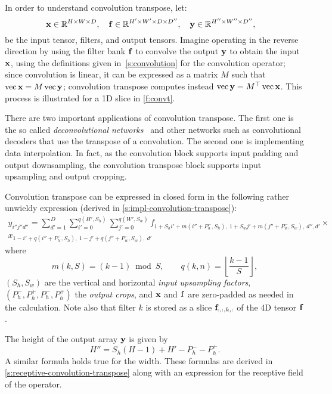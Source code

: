 In order to understand convolution transpose, let:
\[
 \mathbf{x}\in\mathbb{R}^{H \times W \times D}, \quad
 \mathbf{f}\in\mathbb{R}^{H' \times W' \times D \times D''}, \quad
 \mathbf{y}\in\mathbb{R}^{H'' \times W'' \times D''}, \quad
\]
be the input tensor, filters, and output tensors. Imagine operating in the reverse direction by using the filter bank $\mathbf{f}$ to convolve the output $\mathbf{y}$ to obtain the input $\mathbf{x}$, using the definitions given in~\cref{s:convolution} for the convolution operator; since convolution is linear, it can be expressed as a matrix $M$ such that  $\operatorname{vec} \mathbf{x} = M \operatorname{vec}\mathbf{y}$; convolution transpose computes instead $\operatorname{vec} \mathbf{y} = M^\top \operatorname{vec} \mathbf{x}$. This process is illustrated for a 1D slice in \cref{f:convt}.

There are two important applications of convolution transpose. The first one is the so called \emph{deconvolutional networks}~\cite{zeiler14visualizing} and other networks such as convolutional decoders that use the transpose of a convolution. The second one is implementing data interpolation. In fact, as the convolution block supports input padding and output downsampling, the convolution transpose block supports input upsampling and output cropping.

Convolution transpose can be expressed in closed form in the following rather unwieldy expression (derived in \cref{s:impl-convolution-transpose}):
\begin{multline}\label{e:convt}
y_{i''j''d''} =
 \sum_{d'=1}^{D}
 \sum_{i'=0}^{q(H',S_h)}
 \sum_{j'=0}^{q(W',S_w)}
f_{
1+ S_hi' + m(i''+ P_h^-, S_h),\ %
1+ S_wj' + m(j''+ P_w^-, S_w),\ %
d'',
d'
}
\times \\
x_{
1 - i' + q(i''+P_h^-,S_h),\ %
1 - j' + q(j''+P_w^-,S_w),\ %
d'
}
\end{multline}
where
\[
m(k,S) = (k - 1) \bmod S,
\qquad
q(k,n) = \left\lfloor \frac{k-1}{S} \right\rfloor,
\]
$(S_h,S_w)$ are the vertical and horizontal \emph{input upsampling factors},  $(P_h^-,P_h^+,P_h^-,P_h^+)$ the \emph{output crops}, and $\mathbf{x}$ and $\mathbf{f}$ are zero-padded as needed in the calculation. Note also that filter $k$ is stored as a slice $\mathbf{f}_{:,:,k,:}$ of the 4D tensor $\mathbf{f}$.

The height of the output array $\mathbf{y}$ is given by
\[
  H'' = S_h (H - 1) + H' -P^-_h - P^+_h.
\]
A similar formula holds true for the width. These formulas are derived in \cref{s:receptive-convolution-transpose} along with an expression for the receptive field of the operator.

